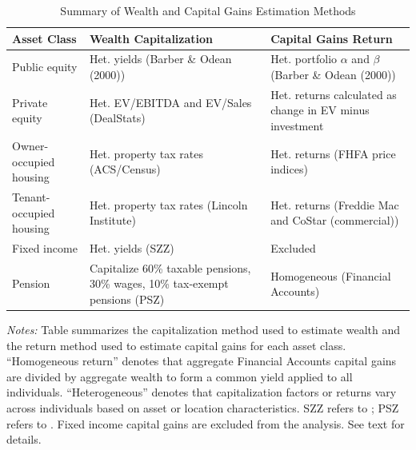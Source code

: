 \begin{table}[H]
\centering
\caption{Summary of Wealth and Capital Gains Estimation Methods}
\label{tab:estimation_methods}
\small
\begin{tabularx}{\textwidth}{lXX}
\toprule
Asset Class & Wealth Capitalization & Capital Gains Return \\
\midrule
Public equity & Het. yields (Barber \& Odean (2000)) & Het. portfolio $\alpha$ and $\beta$ (Barber \& Odean (2000)) \\[6pt]
Private equity & Het. EV/EBITDA and EV/Sales (DealStats) & Het. returns calculated as change in EV minus investment \\[6pt]
Owner-occupied housing & Het. property tax rates (ACS/Census) & Het. returns (FHFA price indices) \\[6pt]
Tenant-occupied housing & Het. property tax rates (Lincoln Institute) & Het. returns (Freddie Mac and CoStar (commercial)) \\[6pt]
Fixed income & Het. yields (SZZ) & Excluded \\[6pt]
Pension & Capitalize 60\% taxable pensions, 30\% wages, 10\% tax-exempt pensions (PSZ) & Homogeneous (Financial Accounts) \\
\bottomrule
\end{tabularx}
\begin{minipage}{0.95\textwidth}
\vspace{0.5em}
\footnotesize
\textit{Notes:} Table summarizes the capitalization method used to estimate wealth and the return method used to estimate capital gains for each asset class. ``Homogeneous return'' denotes that aggregate Financial Accounts capital gains are divided by aggregate wealth to form a common yield applied to all individuals. ``Heterogeneous'' denotes that capitalization factors or returns vary across individuals based on asset or location characteristics. SZZ refers to \citet{smith2023}; PSZ refers to \citet{piketty2016distributional}. Fixed income capital gains are excluded from the analysis. See text for details.
\end{minipage}
\end{table}
